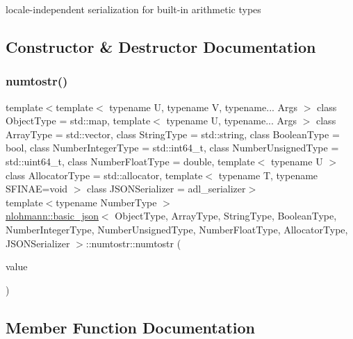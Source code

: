 locale-\/independent serialization for built-\/in arithmetic types 

\subsection{Constructor \& Destructor Documentation}
\mbox{\label{structnlohmann_1_1basic__json_1_1numtostr_aae1838cf4f7bb8057a895348b8e56920}} 
\subsubsection{\texorpdfstring{numtostr()}{numtostr()}}
{\footnotesize\ttfamily template$<$template$<$ typename U, typename V, typename... Args $>$ class Object\+Type = std\+::map, template$<$ typename U, typename... Args $>$ class Array\+Type = std\+::vector, class String\+Type  = std\+::string, class Boolean\+Type  = bool, class Number\+Integer\+Type  = std\+::int64\+\_\+t, class Number\+Unsigned\+Type  = std\+::uint64\+\_\+t, class Number\+Float\+Type  = double, template$<$ typename U $>$ class Allocator\+Type = std\+::allocator, template$<$ typename T, typename S\+F\+I\+N\+A\+E=void $>$ class J\+S\+O\+N\+Serializer = adl\+\_\+serializer$>$ \\
template$<$typename Number\+Type $>$ \\
\hyperlink{classnlohmann_1_1basic__json}{nlohmann\+::basic\+\_\+json}$<$ Object\+Type, Array\+Type, String\+Type, Boolean\+Type, Number\+Integer\+Type, Number\+Unsigned\+Type, Number\+Float\+Type, Allocator\+Type, J\+S\+O\+N\+Serializer $>$\+::numtostr\+::numtostr (\begin{DoxyParamCaption}\item[{Number\+Type}]{value }\end{DoxyParamCaption})\hspace{0.3cm}{\ttfamily [inline]}}



\subsection{Member Function Documentation}
\mbox{\label{structnlohmann_1_1basic__json_1_1numtostr_aefbc540c4892642540a7f232fcb81448}} 
